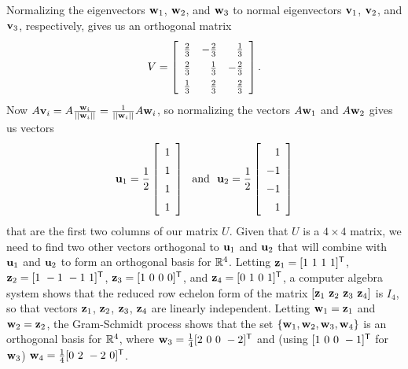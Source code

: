 \begin{example}
\item Normalizing the eigenvectors $\mathbf{w}_1$, $\mathbf{w}_2$, and $\mathbf{w}_3$ to normal eigenvectors $\mathbf{v}_1$, $\mathbf{v}_2$, and $\mathbf{v}_3$, respectively, gives us an orthogonal matrix
\[V = \left[ \renewcommand{\arraystretch}{1.4} \begin {array}{crr} \frac{2}{3}&-\frac{2}{3}&\frac{1}{3}\\ \frac{2}{3}&\frac{1}{3}&-
\frac{2}{3}\\  \frac{1}{3}&\frac{2}{3}&\frac{2}{3}\end {array} \right].\]
Now $A \mathbf{v}_i = A \frac{\mathbf{w}_i}{||\mathbf{w}_i||} = \frac{1}{||\mathbf{w}_i||} A \mathbf{w}_i$, so normalizing the vectors $A \mathbf{w}_1$ and $A \mathbf{w}_2$ gives us vectors \[\vu_1 = \frac{1}{2} \left[ \begin{array}{c} 1\\1\\1\\1\\ \end{array} \right] \ \text{ and } \ \vu_2 = \frac{1}{2} \left[ \begin{array}{r} 1\\-1\\-1\\1\\ \end{array} \right]\]
that are the first two columns of our matrix $U$. Given that $U$ is a $4 \times 4$ matrix, we need to find two other vectors orthogonal to $\mathbf{u}_1$ and $\mathbf{u}_2$ that will combine with $\mathbf{u}_1$ and $\mathbf{u}_2$ to form an orthogonal basis for $\mathbb{R}^4$. Letting $\mathbf{z}_1 = [1 \ 1 \ 1 \ 1]^{\mathsf{T}}$, $\mathbf{z}_2 = [1 \ -1 \ -1 \ 1]^{\mathsf{T}}$, $\mathbf{z}_3 = [1 \ 0 \ 0 \ 0]^{\mathsf{T}}$, and $\mathbf{z}_4 = [0 \ 1 \ 0 \ 1]^{\mathsf{T}}$, a computer algebra system shows that the reduced row echelon form of the matrix $[\mathbf{z}_1 \ \mathbf{z}_2 \ \mathbf{z}_3 \ \mathbf{z}_4]$ is $I_4$, so that vectors $\mathbf{z}_1$, $\mathbf{z}_2$, $\mathbf{z}_3$, $\mathbf{z}_4$ are linearly independent. Letting $\mathbf{w}_1 = \mathbf{z}_1$ and $\mathbf{w}_2 = \mathbf{z}_2$, the Gram-Schmidt process shows that the set $\{\mathbf{w}_1, \mathbf{w}_2, \mathbf{w}_3, \mathbf{w}_4\}$ is an orthogonal basis for $\mathbb{R}^4$, where $\mathbf{w}_3 = \frac{1}{4} [2 \ 0 \ 0 \ -2]^{\mathsf{T}}$ and (using $[1 \ 0 \ 0 \ -1]^{\mathsf{T}}$ for $\mathbf{w}_3$) $\vw_4 = \frac{1}{4} [0 \ 2 \ -2 \ 0]^{\tr}$.


\end{example}
